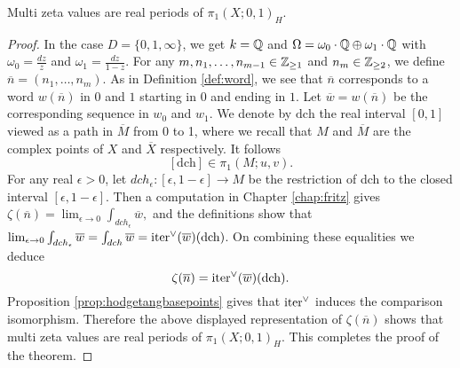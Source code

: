 \begin{thm}
Multi zeta values are real periods of $\pi_1(X;0,1)_H$.
\end{thm} 
\begin{proof}
In the case $D=\{0,1,\infty\}$, we get $k=\mathbb{Q}$ and $\Omega = \omega_0\cdot\mathbb{Q} \oplus \omega_1\cdot\mathbb{Q}$ with $\omega_0=\frac{dz}{z}$  and $\omega_1=\frac{dz}{1-z}$. 
For any $m,n_1,\dotsc,n_{m-1}\in \mathbb{Z}_{\geq 1}$ and $n_m\in \mathbb{Z}_{\geq 2}$, we define $\overline{n} = (n_1, \ldots, n_m)$. 
As in Definition \ref{def:word}, we see that $\overline{n}$ corresponds to a word $w(\overline{n})$ in $0$ and $1$ starting in $0$ and ending in $1$. 
Let $\overline{w} = w(\overline{n})$ be the corresponding sequence in $w_0$ and $w_1$. 
We denote by $\mathrm{dch}$ the real interval $[0,1]$ viewed as a path in $\overline{M}$ from 0 to 1, where we recall that $M$ and $\overline{M}$ are the complex points of $X$ and $\overline{X}$ respectively. It follows  
$$[\mathrm{dch}] \in \pi_1(M;u,v).$$ 
For any real $\epsilon>0$, let $dch_{\epsilon}:[\epsilon,1-\epsilon]\to M$ be the restriction of dch to the closed interval $[\epsilon,1-\epsilon]$. Then  a computation in Chapter \ref{chap:fritz} gives
$
\zeta(\overline{n}) = \lim_{\epsilon \to 0} \int_{dch_{\epsilon}} \overline{w},
$
and the definitions show that $\lim_{\epsilon \to 0}\int_{dch_{\epsilon}}\overline{w}=\int_{dch} \overline{w}
= \mathrm{iter}^{\vee}(\overline{w})(\mathrm{dch})$. On combining these equalities we deduce
$$\zeta(\overline{n})=\mathrm{iter}^{\vee}(\overline{w})(\mathrm{dch}).$$
Proposition \ref{prop:hodgetangbasepoints} gives that $\mathrm{iter}^{\vee}$ induces the comparison isomorphism. Therefore the above displayed representation of $\zeta(\overline{n})$ shows that multi zeta values are real periods of $\pi_1(X;0,1)_H$. This completes the proof of the theorem.
\end{proof}

